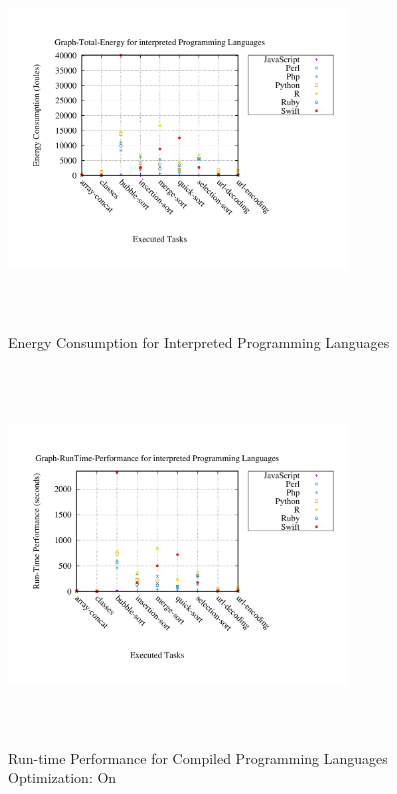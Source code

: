 \begin{figure}
	\centering
	\includegraphics[width=9cm,height=10cm,keepaspectratio]{"Graph_Graph-Total-Energy_interpreted"}
	\caption{ Energy Consumption for Interpreted Programming Languages}
	\label{Interpreted Total}
\end{figure}

\begin{figure}
	\centering
	\includegraphics[width=9cm,height=10cm,keepaspectratio]{"Graph_Graph-RunTime-Performance_interpreted"}
	\caption{Run-time Performance for Compiled Programming Languages Optimization: On}
	\label{Performance Interpreted Total}
\end{figure}

